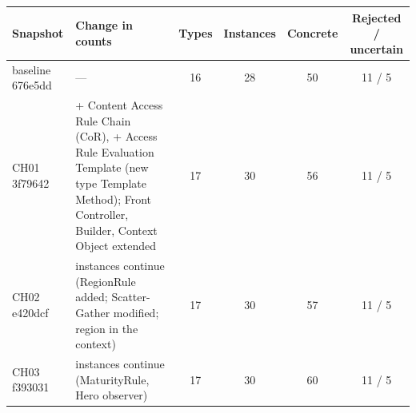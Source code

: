 \documentclass[11pt,a4paper]{article}
\begin{document}
\begin{tabularx}{\linewidth}{@{}lXcccc@{}}\toprule Snapshot & Change in counts & Types & Instances & Concrete & Rejected / uncertain\\\midrule
baseline 676e5dd & --- & 16 & 28 & 50 & 11 / 5\\
CH01 3f79642 & + Content Access Rule Chain (CoR), + Access Rule Evaluation Template (new type Template Method); Front Controller, Builder, Context Object extended & 17 & 30 & 56 & 11 / 5\\
CH02 e420dcf & instances continue (RegionRule added; Scatter-Gather modified; region in the context) & 17 & 30 & 57 & 11 / 5\\
CH03 f393031 & instances continue (MaturityRule, Hero observer) & 17 & 30 & 60 & 11 / 5\\\bottomrule
\end{tabularx}
\end{document}
